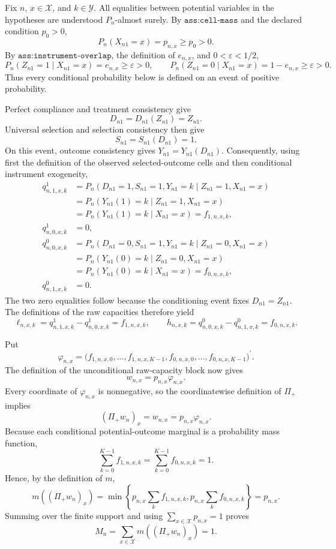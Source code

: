 Fix \(n\), \(x\in\mathcal X\), and \(k\in\mathcal Y\).  All equalities between potential variables in the hypotheses are understood \(P_n\)-almost surely.  By \(\texttt{ass:cell-mass}\) and the declared condition \(p_0>0\),
\[
P_n(X_{n1}=x)=p_{n,x}\ge p_0>0.
\]
By \(\texttt{ass:instrument-overlap}\), the definition of \(e_{n,x}\), and \(0<\varepsilon<1/2\),
\[
P_n(Z_{n1}=1\mid X_{n1}=x)=e_{n,x}\ge\varepsilon>0,
\qquad
P_n(Z_{n1}=0\mid X_{n1}=x)=1-e_{n,x}\ge\varepsilon>0.
\]
Thus every conditional probability below is defined on an event of positive probability.

Perfect compliance and treatment consistency give
\[
D_{n1}=D_{n1}(Z_{n1})=Z_{n1}.
\]
Universal selection and selection consistency then give
\[
S_{n1}=S_{n1}(D_{n1})=1.
\]
On this event, outcome consistency gives \(Y_{n1}=Y_{n1}(D_{n1})\).  Consequently, using first the definition of the observed selected-outcome cells and then conditional instrument exogeneity,
\[
\begin{aligned}
q^1_{n,1,x,k}
&=P_n(D_{n1}=1,S_{n1}=1,Y_{n1}=k\mid Z_{n1}=1,X_{n1}=x)\\
&=P_n(Y_{n1}(1)=k\mid Z_{n1}=1,X_{n1}=x)\\
&=P_n(Y_{n1}(1)=k\mid X_{n1}=x)
=f_{1,n,x,k},\\
q^1_{n,0,x,k}&=0,\\
q^0_{n,0,x,k}
&=P_n(D_{n1}=0,S_{n1}=1,Y_{n1}=k\mid Z_{n1}=0,X_{n1}=x)\\
&=P_n(Y_{n1}(0)=k\mid Z_{n1}=0,X_{n1}=x)\\
&=P_n(Y_{n1}(0)=k\mid X_{n1}=x)
=f_{0,n,x,k},\\
q^0_{n,1,x,k}&=0.
\end{aligned}
\]
The two zero equalities follow because the conditioning event fixes \(D_{n1}=Z_{n1}\).  The definitions of the raw capacities therefore yield
\[
\ell_{n,x,k}=q^1_{n,1,x,k}-q^1_{n,0,x,k}=f_{1,n,x,k},
\qquad
h_{n,x,k}=q^0_{n,0,x,k}-q^0_{n,1,x,k}=f_{0,n,x,k}.
\]

Put
\[
\varphi_{n,x}
=\bigl(f_{1,n,x,0},\ldots,f_{1,n,x,K-1},
f_{0,n,x,0},\ldots,f_{0,n,x,K-1}\bigr)^{\prime}.
\]
The definition of the unconditional raw-capacity block now gives
\[
w_{n,x}=p_{n,x}\varphi_{n,x}.
\]
Every coordinate of \(\varphi_{n,x}\) is nonnegative, so the coordinatewise definition of \(\Pi_+\) implies
\[
(\Pi_+w_n)_x=w_{n,x}=p_{n,x}\varphi_{n,x}.
\]
Because each conditional potential-outcome marginal is a probability mass function,
\[
\sum_{k=0}^{K-1}f_{1,n,x,k}
=\sum_{k=0}^{K-1}f_{0,n,x,k}=1.
\]
Hence, by the definition of \(m\),
\[
m((\Pi_+w_n)_x)
=\min\left\{p_{n,x}\sum_k f_{1,n,x,k},
p_{n,x}\sum_k f_{0,n,x,k}\right\}=p_{n,x}.
\]
Summing over the finite support and using \(\sum_{x\in\mathcal X}p_{n,x}=1\) proves
\[
M_n=\sum_{x\in\mathcal X}m((\Pi_+w_n)_x)=1.
\]

